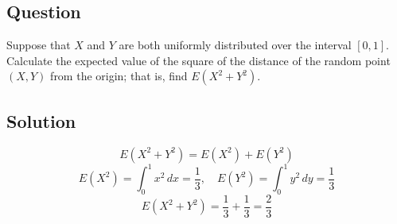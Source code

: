 \documentclass[12pt]{article}
\begin{document}
\subsection*{Question}
Suppose that \(X\) and \(Y\) are both uniformly distributed over the interval \([0, 1]\). Calculate the expected value of the square of the distance of the random point \((X, Y)\) from the origin; that is, find \(E(X^2 + Y^2)\).

\subsection*{Solution}
\[
  E(X^2 + Y^2) = E(X^2) + E(Y^2)
\]
\[
  E(X^2) = \int_0^1 x^2 \, dx = \frac{1}{3}, \quad E(Y^2) = \int_0^1 y^2 \, dy = \frac{1}{3}
\]
\[
  E(X^2 + Y^2) = \frac{1}{3} + \frac{1}{3} = \frac{2}{3}
\]
\pagebreak
\end{document}
